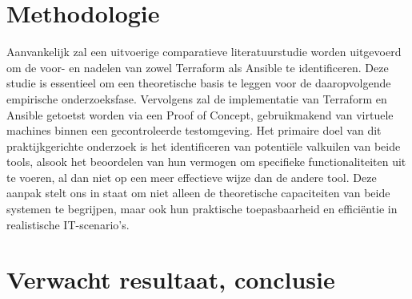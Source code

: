 \section{Methodologie}%
\label{sec:methodologie}

Aanvankelijk zal een uitvoerige comparatieve literatuurstudie worden uitgevoerd om de voor- en nadelen van zowel Terraform als Ansible te identificeren. Deze studie is essentieel om een theoretische basis te leggen voor de daaropvolgende empirische onderzoeksfase. Vervolgens zal de implementatie van Terraform en Ansible getoetst worden via een Proof of Concept, gebruikmakend van virtuele machines binnen een gecontroleerde testomgeving. Het primaire doel van dit praktijkgerichte onderzoek is het identificeren van potentiële valkuilen van beide tools, alsook het beoordelen van hun vermogen om specifieke functionaliteiten uit te voeren, al dan niet op een meer effectieve wijze dan de andere tool. Deze aanpak stelt ons in staat om niet alleen de theoretische capaciteiten van beide systemen te begrijpen, maar ook hun praktische toepasbaarheid en efficiëntie in realistische IT-scenario's.

\section{Verwacht resultaat, conclusie}%
\label{sec:verwachte_resultaten}

